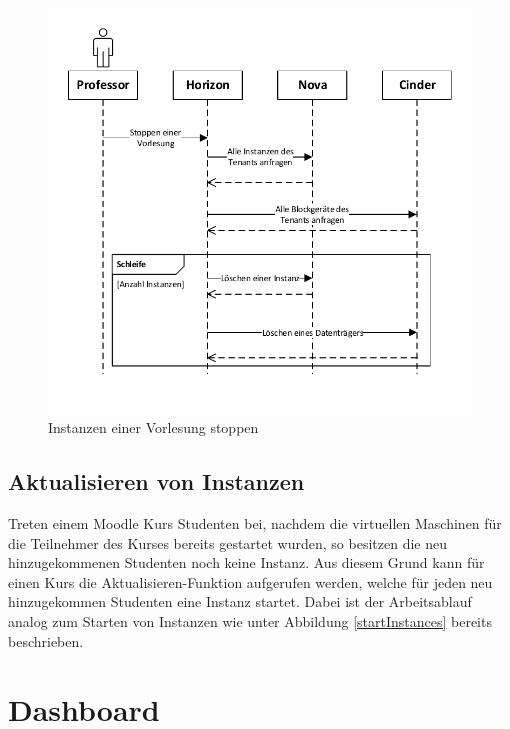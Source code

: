 \begin{figure}[H]
	\centering
	\includegraphics[scale=0.6]{img/stopInstances.pdf}
\caption{Instanzen einer Vorlesung stoppen}
\label{stopInstances}
\FloatBarrier
\end{figure}

\subsection{Aktualisieren von Instanzen}
Treten einem Moodle Kurs Studenten bei, nachdem die virtuellen Maschinen für die
Teilnehmer des Kurses bereits gestartet wurden, so besitzen die neu hinzugekommenen Studenten noch
keine Instanz. Aus diesem Grund kann für einen Kurs die Aktualisieren-Funktion aufgerufen werden,
welche für jeden neu hinzugekommen Studenten eine Instanz startet. 
Dabei ist der Arbeitsablauf analog zum Starten von Instanzen wie unter Abbildung 
\ref{startInstances} bereits beschrieben.

\section{Dashboard}

